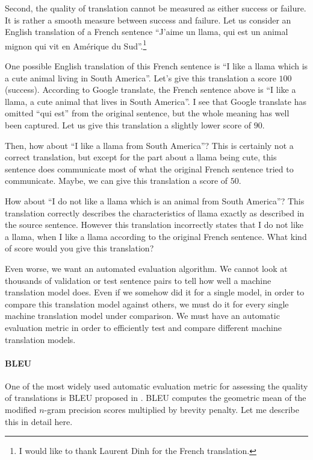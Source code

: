 \documentclass{report}
\begin{document}
Second, the quality of translation cannot be measured as either success or
failure. It is rather a smooth measure between success and failure. Let us
consider an English translation of a French sentence ``J'aime un llama, qui est
un animal mignon qui vit en Am\'erique du Sud''.\footnote{
    I would like to thank Laurent Dinh for the French translation.
}

One possible English translation of this French sentence is ``I like a llama
which is a cute animal living in South America''. Let's give this translation a
score $100$ (success). According to Google translate, the French sentence above
is ``I like a llama, a cute animal that lives in South America''. I see that
Google translate has omitted ``qui est'' from the original sentence, but the
whole meaning has well been captured. Let us give this translation a slightly
lower score of $90$. 

Then, how about ``I like a llama from South America''?  This is certainly not a
correct translation, but except for the part about a llama being cute, this
sentence does communicate most of what the original French sentence tried to
communicate. Maybe, we can give this translation a score of $50$. 

How about ``I do not like a llama which is an animal from South America''? This
translation correctly describes the characteristics of llama exactly as
described in the source sentence. However this translation incorrectly states
that I do not like a llama, when I like a llama according to the original French
sentence. What kind of score would you give this translation?

Even worse, we want an automated evaluation algorithm. We cannot look at
thousands of validation or test sentence pairs to tell how well a machine
translation model does. Even if we somehow did it for a single model, in order
to compare this translation model against others, we must do it for every single
machine translation model under comparison. We must have an automatic evaluation
metric in order to efficiently test and compare different machine translation
models.

\paragraph{BLEU} 
One of the most widely used automatic evaluation metric for assessing the
quality of translations is BLEU proposed in \citet{papineni2002bleu}. BLEU
computes the geometric mean of the modified $n$-gram precision scores multiplied
by brevity penalty. Let me describe this in detail here.
\end{document}
